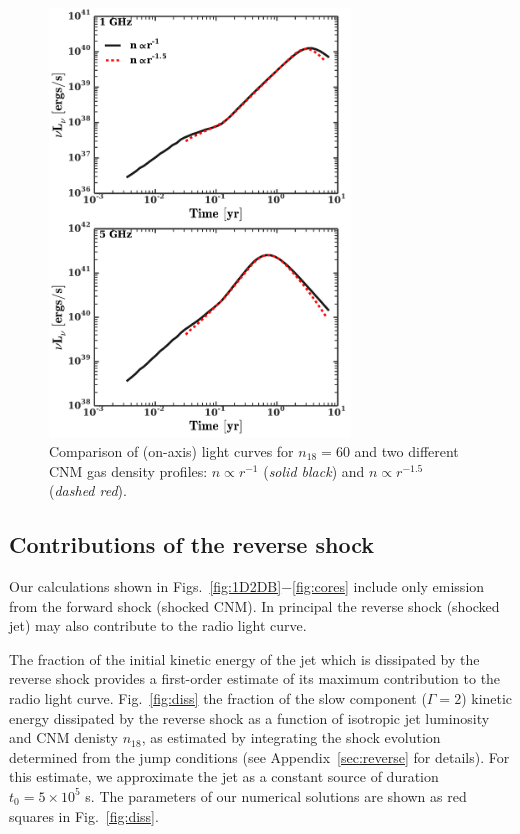 \documentclass[usenatbib,fleqn]{mnras}
\begin{document}
\begin{figure} 
  \includegraphics[width=8cm]{profs2.pdf}
  \caption{\label{fig:profs2} Comparison of (on-axis) light curves for
    $n_{18}=60$ and two different CNM gas density profiles: $n\propto
    r^{-1}$ ({\it solid black}) and $n\propto r^{-1.5}$ ({\it dashed
      red}).}
\end{figure}

\subsection{Contributions of the reverse shock}
Our calculations shown in Figs.~\ref{fig:1D2DB}$-$\ref{fig:cores} include only emission from the forward shock (shocked CNM).  In principal the reverse shock (shocked jet) may also contribute to the radio light curve.  

The fraction of the initial kinetic energy of the jet which is dissipated by the reverse shock provides a first-order estimate of its maximum contribution to the radio light curve.  Fig.~\ref{fig:diss} the fraction of the slow component ($\Gamma=2$) kinetic energy dissipated by the reverse shock as a function of isotropic jet luminosity and CNM denisty $n_{18}$, as estimated by integrating the shock evolution determined from the 
jump conditions (see Appendix~\ref{sec:reverse} for details).  For this estimate, we approximate the jet as a constant source of duration $t_0 = 5 \times 10^{5}$ s.  The parameters of our numerical solutions are shown as red squares in Fig.~\ref{fig:diss}.
\end{document}
